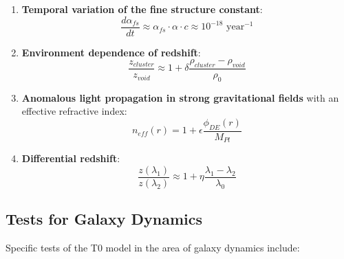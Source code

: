 \documentclass[a4paper,12pt]{article}
\begin{document}
	\begin{enumerate}
		\item \textbf{Temporal variation of the fine structure constant}:
		\begin{equation}
			\frac{d\alpha_{fs}}{dt} \approx \alpha_{fs} \cdot \alpha \cdot c \approx 10^{-18} \text{ year}^{-1}
		\end{equation}
		
		\item \textbf{Environment dependence of redshift}:
		\begin{equation}
			\frac{z_{cluster}}{z_{void}} \approx 1 + \delta\frac{\rho_{cluster} - \rho_{void}}{\rho_0}
		\end{equation}
		
		\item \textbf{Anomalous light propagation in strong gravitational fields} with an effective refractive index:
		\begin{equation}
			n_{eff}(r) = 1 + \epsilon \frac{\phi_{DE}(r)}{M_{Pl}}
		\end{equation}
		
		\item \textbf{Differential redshift}:
		\begin{equation}
			\frac{z(\lambda_1)}{z(\lambda_2)} \approx 1 + \eta\frac{\lambda_1 - \lambda_2}{\lambda_0}
		\end{equation}
	\end{enumerate}
	
	\subsection{Tests for Galaxy Dynamics}
	
	Specific tests of the T0 model in the area of galaxy dynamics include:
	
\end{document}
